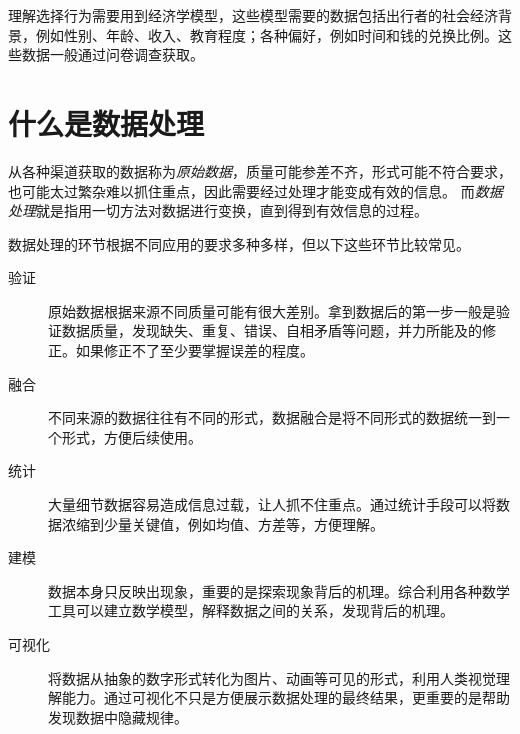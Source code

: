理解选择行为需要用到经济学模型，这些模型需要的数据包括出行者的社会经济背景，例如性别、年龄、收入、教育程度；各种偏好，例如时间和钱的兑换比例。这些数据一般通过问卷调查获取。

\section{什么是数据处理}

从各种渠道获取的数据称为\emph{原始数据}，质量可能参差不齐，形式可能不符合要求，也可能太过繁杂难以抓住重点，因此需要经过处理才能变成有效的信息。
而\emph{数据处理}就是指用一切方法对数据进行变换，直到得到有效信息的过程。

数据处理的环节根据不同应用的要求多种多样，但以下这些环节比较常见。

\begin{description}
    \item[验证] 原始数据根据来源不同质量可能有很大差别。拿到数据后的第一步一般是验证数据质量，发现缺失、重复、错误、自相矛盾等问题，并力所能及的修正。如果修正不了至少要掌握误差的程度。
    \item[融合] 不同来源的数据往往有不同的形式，数据融合是将不同形式的数据统一到一个形式，方便后续使用。
    \item[统计] 大量细节数据容易造成信息过载，让人抓不住重点。通过统计手段可以将数据浓缩到少量关键值，例如均值、方差等，方便理解。
    \item[建模] 数据本身只反映出现象，重要的是探索现象背后的机理。综合利用各种数学工具可以建立数学模型，解释数据之间的关系，发现背后的机理。
    \item[可视化] 将数据从抽象的数字形式转化为图片、动画等可见的形式，利用人类视觉理解能力。通过可视化不只是方便展示数据处理的最终结果，更重要的是帮助发现数据中隐藏规律。
\end{description}
